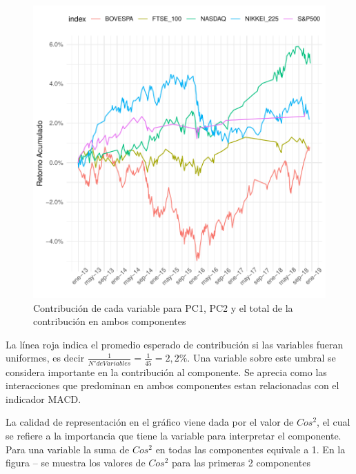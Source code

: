 \documentclass[a4paper,12pt]{Latex/Classes/PhDthesisPSnPDF}
\begin{document}
\begin{figure}[H]
\centering
\includegraphics{main-013}
\caption{Contribución de cada variable para PC1, PC2 y el total de la contribución en ambos componentes}
\end{figure}

La línea roja indica el promedio esperado de contribución si las variables fueran uniformes, es decir $ \frac{1}{N° de Variables} = \frac{1}{45} = 2,2\%$. Una variable sobre este umbral se considera importante en la contribución al componente. Se aprecia como las interacciones que predominan en ambos componentes estan relacionadas con el indicador MACD.

La calidad de representación en el gráfico viene dada por el valor de $Cos^2$, el cual se refiere a la importancia que tiene la variable para interpretar el componente. Para una variable la suma de $Cos^2$ en todas las componentes equivale a 1. En la figura -- se muestra los valores de $Cos^2$ para las primeras 2 componentes
\end{document}
